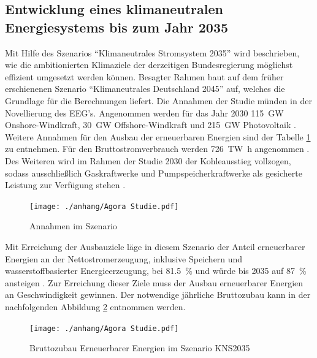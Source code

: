 	
	\subsection{Entwicklung eines klimaneutralen Energiesystems bis zum Jahr 2035} \label{sect: 2030} 
		
		Mit Hilfe des Szenarios "`Klimaneutrales Stromsystem 2035"' wird beschrieben, wie die ambitionierten Klimaziele der derzeitigen Bundesregierung möglichst effizient umgesetzt werden können. 
		Besagter Rahmen baut auf dem früher erschienenen Szenario "`Klimaneutrales Deutschland 2045"' auf, welches die Grundlage für die Berechnungen liefert. 
		Die Annahmen der Studie münden in der Novellierung des EEG's. 
		Angenommen werden für das Jahr 2030 \SI{115}{\giga\watt} Onshore-Windkraft, \SI{30}{\giga\watt} Offshore-Windkraft und \SI{215}{\giga\watt} Photovoltaik \cite[S.22]{Agora_KlimaneutralesStromsystem}. 
		Weitere Annahmen für den Ausbau der erneuerbaren Energien sind der Tabelle \ref{Abb. Annahmen Agora2035} zu entnehmen.
		Für den Bruttostromverbrauch werden \SI{726}{\tera\watt\hour} angenommen \cite[S.33]{Agora_KlimaneutralesStromsystem}. 
		Des Weiteren wird im Rahmen der Studie 2030 der Kohleausstieg vollzogen, sodass ausschließlich Gaskraftwerke und Pumpspeicherkraftwerke als gesicherte Leistung zur Verfügung stehen \cite[S.31]{Agora_KlimaneutralesStromsystem}. 
		
		\begin{figure} [H]
			\centering
			\label{Abb. Annahmen Agora2035} 
			\texttt{[image: ./anhang/Agora Studie.pdf]}
			\caption{Annahmen im Szenario \cite[S.22]{Agora_KlimaneutralesStromsystem}}
		\end{figure}
	
		Mit Erreichung der Ausbauziele läge in diesem Szenario der Anteil erneuerbarer Energien an der Nettostromerzeugung, inklusive Speichern und wasserstoffbasierter Energieerzeugung, bei \SI{81,5}{\percent} und würde bis 2035 auf \SI{87}{\percent} ansteigen \cite[S.23]{Agora_KlimaneutralesStromsystem}.  
		Zur Erreichung dieser Ziele muss der Ausbau erneuerbarer Energien an Geschwindigkeit gewinnen. 
		Der notwendige jährliche Bruttozubau kann in der nachfolgenden Abbildung \ref{Abb.Zubau PV Agora2035} entnommen werden. 
		
		\begin{figure} [H]
			\centering
			\label{Abb.Zubau PV Agora2035} 
			\texttt{[image: ./anhang/Agora Studie.pdf]}
			\caption{Bruttozubau Erneuerbarer Energien im Szenario KNS2035 \cite[S.24]{Agora_KlimaneutralesStromsystem}}
		\end{figure}
	
